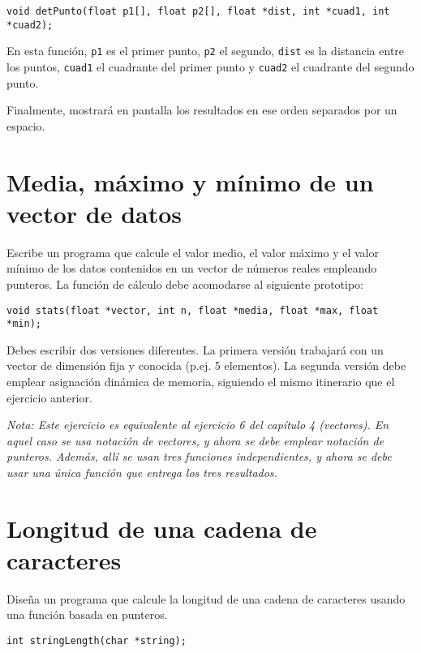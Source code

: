 \documentclass[a4paper]{article}
\begin{document}
\lstset{language=C,label= ,caption= ,captionpos=b,numbers=none}
\begin{lstlisting}
void detPunto(float p1[], float p2[], float *dist, int *cuad1, int *cuad2);
\end{lstlisting}

En esta función, \texttt{p1} es el primer punto, \texttt{p2} el segundo, \texttt{dist} es la distancia entre los puntos, \texttt{cuad1} el cuadrante del primer punto y \texttt{cuad2} el  cuadrante del segundo punto.

Finalmente, mostrará en pantalla los resultados en ese orden separados por un espacio.

\section{Media, máximo y mínimo de un vector de datos}
\label{sec:org433e1a2}

Escribe un programa que calcule el valor medio, el valor máximo y el valor mínimo de los datos contenidos en un vector de números reales empleando punteros. La función de cálculo debe acomodarse al siguiente prototipo:

\lstset{language=C,label= ,caption= ,captionpos=b,numbers=none}
\begin{lstlisting}
void stats(float *vector, int n, float *media, float *max, float *min);
\end{lstlisting}

Debes escribir dos versiones diferentes. La primera versión trabajará con un vector de dimensión fija y conocida (p.ej. 5 elementos). La segunda versión debe emplear asignación dinámica de memoria, siguiendo el mismo itinerario que el ejercicio anterior.

\emph{Nota: Este ejercicio es equivalente al ejercicio 6 del capítulo 4 (vectores). En aquel caso se usa notación de vectores, y ahora se debe emplear notación de punteros. Además, allí se usan tres funciones independientes, y ahora se debe usar una única función que entrega los tres resultados.}

\section{Longitud de una cadena de caracteres}
\label{sec:org3d87f58}

Diseña un programa que calcule la longitud de una cadena de caracteres usando una función basada en punteros.

\lstset{language=C,label= ,caption= ,captionpos=b,numbers=none}
\begin{lstlisting}
int stringLength(char *string);
\end{lstlisting}
\end{document}
